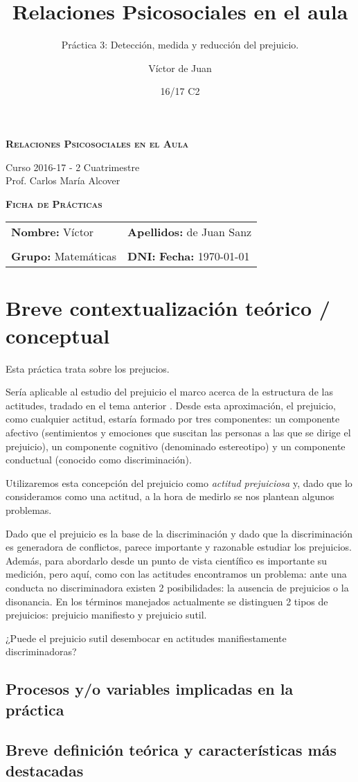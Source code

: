 \documentclass[palatino,nochap]{apuntesURJC}
\title{Relaciones Psicosociales en el aula}
\subtitle{Práctica 3: Detección, medida y reducción del prejuicio.}
\author{Víctor de Juan}
\date{16/17 C2}
\newcommand{\makeheader}[1]{
\begin{center}
\Large \textbf{\textsc{Relaciones Psicosociales en el Aula}}\\
\end{center}
\begin{center}
\large Curso 2016-17 - 2 Cuatrimestre\\
Prof. Carlos María Alcover
\end{center}

\begin{center}
\Large \textbf{\textsc{Ficha de Prácticas}}
\end{center}

\begin{center}
\begin{tabular}{ll}
\hspace{2cm}\textbf{Nombre:} Víctor &  \hspace{1.5cm} \textbf{Apellidos:} de Juan Sanz\\
\vspace{0.3cm}&\\
\textbf{Grupo:} Matemáticas 	& \textbf{DNI:} %
 \hspace{3cm} \textbf{Fecha:} #1
\end{tabular}
\end{center}
}
\begin{document}
\pagestyle{plain}
\maketitle

\makeheader{\today}

\section{Breve contextualización teórico / conceptual}
\label{intro}

Esta práctica trata sobre los prejucios.

Sería aplicable al estudio del prejuicio el marco acerca de la estructura de las actitudes, tradado en el tema anterior \cite{UNEDPrejuicio}.
%
Desde esta aproximación, el prejuicio, como cualquier actitud, estaría formado por tres componentes: un componente afectivo (sentimientos y emociones que suscitan las personas a las que se dirige el prejuicio), un componente cognitivo (denominado estereotipo) y un componente conductual (conocido como discriminación).

Utilizaremos esta concepción del prejuicio como \textit{actitud prejuiciosa} y, dado que lo consideramos como una actitud, a la hora de medirlo se nos plantean algunos problemas.

Dado que el prejuicio es la base de la discriminación y dado que la discriminación es generadora de conflictos, parece importante y razonable estudiar los prejuicios. 
%
Además, para abordarlo desde un punto de vista científico es importante su medición, pero aquí, como con las actitudes encontramos un problema: ante una conducta no discriminadora existen 2 posibilidades: la ausencia de prejuicios o la disonancia.
%
En los términos manejados actualmente se distinguen 2 tipos de prejuicios: prejuicio manifiesto y prejuicio sutil.


¿Puede el prejuicio sutil desembocar en actitudes manifiestamente discriminadoras?


\subsection{Procesos y/o variables implicadas en la práctica}


\subsection{Breve definición teórica y características más destacadas}
\end{document}
